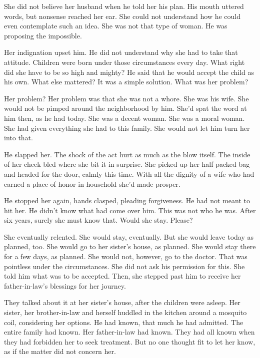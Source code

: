 \documentclass{article}
\newcommand{\egnote}{\todo[color=violet!30]}
\begin{document}
She did not believe her husband when he told her his plan. His mouth uttered words, but nonsense reached her ear. She could not understand how he could even contemplate such an idea. She was not that type of woman. He was proposing the impossible.

Her indignation upset him. He did not understand why she had to take that attitude. Children were born under those circumstances every day. What right did she have to be so high and mighty? He said that he would accept the child as his own. What else mattered? It was a simple solution. What was her problem?

Her problem? Her problem was that she was not a whore. She was his wife. She would not be pimped around the neighborhood by him. She'd spat the word at him then, as he had today. She was a decent woman. She was a moral woman. She had given everything she had to this family. She would not let him turn her into that.

He slapped her. The shock of the act hurt as much as the blow itself. The inside of her cheek bled where she bit it in surprise. She picked up her half packed bag and headed for the door, calmly this time. With all the dignity of a wife who had earned a place of honor in household she'd made prosper. 

He stopped her again, hands clasped, pleading forgiveness. He had not meant to hit her. He didn't know what had come over him. This was not who he was. After six years, surely she must know that. Would she stay. Please?

She eventually relented. She would stay, eventually. But she would leave today as planned, too. She would go to her sister's house, as planned. She would stay there for a few days, as planned. She would not, however, go to the doctor. That was pointless under the circumstances. She did not ask his permission for this. She told him what was to be accepted. Then, she stepped past him to receive her father-in-law's blessings for her journey.

They talked about it at her sister's house, after the children were asleep. Her sister, her brother-in-law and herself huddled in the kitchen around a mosquito coil, considering her options. He\egnote{`he' being her husband, and not the brother-in-law?} had known, that much he had admitted. The entire family had known. Her father-in-law had known. They had all known when they had forbidden her to seek treatment. But no one thought fit to let her know, as if the matter did not concern her.
\end{document}
